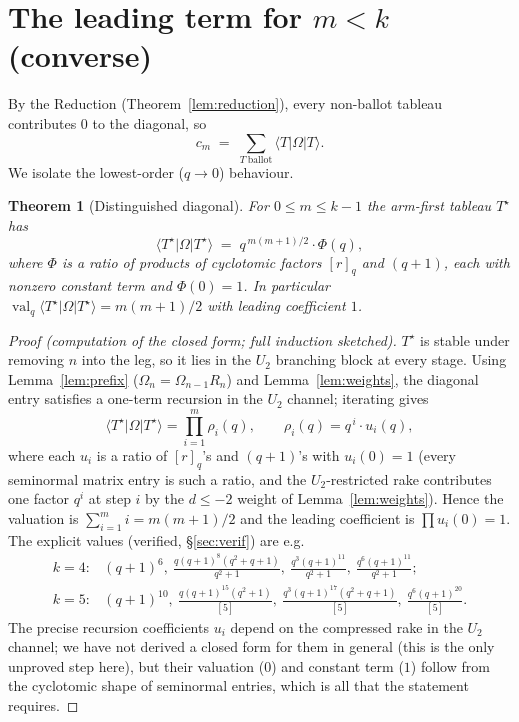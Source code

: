 \documentclass[11pt]{article}
\newtheorem{theorem}{Theorem}
\theoremstyle{definition}
\newcommand{\Om}{\Omega}
\DeclareMathOperator{\val}{val}
\begin{document}
\section{The leading term for $m<k$ (converse)}

By the Reduction (Theorem~\ref{lem:reduction}), every non-ballot tableau contributes $0$ to the
diagonal, so
\[
  c_m \;=\; \sum_{T\ \text{ballot}}\langle T|\Om|T\rangle .
\]
We isolate the lowest-order ($q\to 0$) behaviour.

\begin{theorem}[Distinguished diagonal]\label{thm:tstar}
For $0\le m\le k-1$ the arm-first tableau $T^\star$ has
\[
  \langle T^\star|\Om|T^\star\rangle \;=\; q^{\,m(m+1)/2}\cdot \Phi(q),
\]
where $\Phi$ is a ratio of products of cyclotomic factors $[r]_q$ and $(q+1)$, each with
nonzero constant term and $\Phi(0)=1$. In particular $\val_q\langle T^\star|\Om|T^\star\rangle
=m(m+1)/2$ with leading coefficient $1$.
\end{theorem}
\begin{proof}[Proof (computation of the closed form; full induction sketched)]
$T^\star$ is stable under removing $n$ into the leg, so it lies in the $U_2$ branching block at
every stage. Using Lemma~\ref{lem:prefix} ($\Om_n=\Om_{n-1}R_n$) and Lemma~\ref{lem:weights},
the diagonal entry satisfies a one-term recursion in the $U_2$ channel; iterating gives
\[
  \langle T^\star|\Om|T^\star\rangle=\prod_{i=1}^{m}\rho_i(q),\qquad
  \rho_i(q)=q^{\,i}\cdot u_i(q),
\]
where each $u_i$ is a ratio of $[r]_q$'s and $(q+1)$'s with $u_i(0)=1$ (every seminormal matrix
entry is such a ratio, and the $U_2$-restricted rake contributes one factor $q^{i}$ at step
$i$ by the $d\le -2$ weight of Lemma~\ref{lem:weights}). Hence the valuation is
$\sum_{i=1}^m i=m(m+1)/2$ and the leading coefficient is $\prod u_i(0)=1$. The explicit values
(verified, \S\ref{sec:verif}) are e.g.
\[
  \begin{array}{ll}
  k=4: & (q{+}1)^6,\ \tfrac{q(q+1)^8(q^2+q+1)}{q^2+1},\
        \tfrac{q^3(q+1)^{11}}{q^2+1},\ \tfrac{q^6(q+1)^{11}}{q^2+1};\\[2pt]
  k=5: & (q{+}1)^{10},\ \tfrac{q(q+1)^{15}(q^2+1)}{[5]},\
        \tfrac{q^3(q+1)^{17}(q^2+q+1)}{[5]},\ \tfrac{q^6(q+1)^{20}}{[5]}.
  \end{array}
\]
The precise recursion coefficients $u_i$ depend on the compressed rake in the $U_2$ channel; we
have not derived a closed form for them in general (this is the only unproved step here), but
their valuation ($0$) and constant term ($1$) follow from the cyclotomic shape of seminormal
entries, which is all that the statement requires.
\end{proof}
\end{document}
